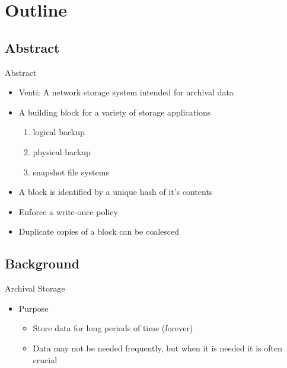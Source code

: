 \section{Outline}\label{outline}

\subsection{Abstract}

\begin{frame}{Abstract}

\begin{itemize}
\itemsep1pt\parskip0pt
\item
  Venti: A network storage system intended for archival data
\item
  A building block for a variety of storage applications

  \begin{enumerate}
  \def\labelenumi{\arabic{enumi})}
  \itemsep1pt\parskip0pt
  \item
    logical backup
  \item
    physical backup
  \item
    snapshot file systems
  \end{enumerate}
\item
  A block is identified by a unique hash of it's contents
\item
  Enforce a write-once policy
\item
  Duplicate copies of a block can be coalesced
\end{itemize}

\subsection{Background}

\end{frame}

\begin{frame}{Archival Storage}

\begin{itemize}
\itemsep1pt\parskip0pt
\item
  Purpose

  \begin{itemize}
  \itemsep1pt\parskip0pt
  \item
    Store data for long periods of time (forever)
  \item
    Data may not be needed frequently, but when it is needed it is often
    crucial
  \end{itemize}
\end{itemize}

\end{frame}

